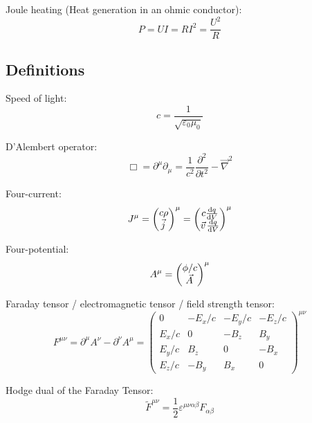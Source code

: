 			\noindent
			Joule heating (Heat generation in an ohmic conductor):
			\begin{equation}
				P = UI = RI^2 = \frac{U^2}{R}
			\end{equation}



	\subsection{Definitions}
		\noindent
		Speed of light:
		\begin{equation}
			c=\frac{1}{\sqrt{\varepsilon_0 \mu_0}}
		\end{equation}

		\noindent
		D'Alembert operator:
		\begin{equation}
			\Box = \partial^\mu \partial_\mu = \frac{1}{c^2}\frac{\partial^2}{\partial t^2} - \vec{\nabla}^2
		\end{equation}

		\noindent
		Four-current:
		\begin{equation}
			J^\mu 
			= \mqty(c\rho\\\vec{j})^\mu
			= \mqty(c\dv{q}{V}\\\vec{v}\dv{q}{V})^\mu
		\end{equation}

		\noindent
		Four-potential:
		\begin{equation}
			A^\mu 
			= \mqty(\phi/c\\\vec{A})^\mu
		\end{equation}

		\noindent
		Faraday tensor / electromagnetic tensor / field strength tensor:
		\begin{equation}
			F^{\mu\nu} = \partial^\mu A^\nu - \partial^\nu A^\mu
			= \left( \begin{matrix}
				0 & -E_x/c & -E_y/c & -E_z/c \\
				E_x/c & 0 & -B_z & B_y \\
				E_y/c	& B_z & 0 & -B_x \\
				E_z/c & -B_y & B_x & 0
			\end{matrix} \right)^{\mu\nu}
		\end{equation}

		\noindent
		Hodge dual of the Faraday Tensor:
		\begin{equation}
			\tilde{F}^{\mu\nu} = \frac{1}{2}\varepsilon^{\mu\nu\alpha\beta}F_{\alpha\beta}
		\end{equation}

